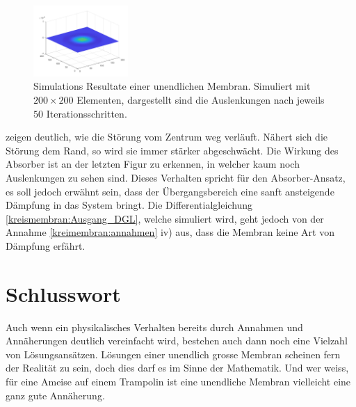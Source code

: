 \begin{figure}
\begin{center}
		\includegraphics[width=0.32\textwidth]{papers/kreismembran/images/sim_2_6.png}
		\caption{Simulations Resultate einer unendlichen Membran. Simuliert mit $ 200 \times 200 $ Elementen, dargestellt sind die Auslenkungen nach jeweils $ 50 $ Iterationsschritten.}
		\label{kreismembran:im:simres_unendlich}
		
	\end{center}	
\end{figure}
zeigen deutlich, wie die Störung vom Zentrum weg verläuft.
Nähert sich die Störung dem Rand, so wird sie immer stärker abgeschwächt.
Die Wirkung des Absorber ist an der letzten Figur zu erkennen, in welcher kaum noch Auslenkungen zu sehen sind.
Dieses Verhalten spricht für den Absorber-Ansatz, es soll jedoch erwähnt sein, dass der Übergangsbereich eine sanft ansteigende Dämpfung in das System bringt.
Die Differentialgleichung \eqref{kreismembran:Ausgang_DGL}, welche
simuliert wird, geht jedoch von der Annahme \ref{kreimembran:annahmen}
iv) aus, dass die Membran keine Art von Dämpfung erfährt.

\section{Schlusswort}
Auch wenn ein physikalisches Verhalten bereits durch Annahmen und
Annäherungen deutlich vereinfacht wird, bestehen auch dann noch
eine Vielzahl von Lösungsansätzen.
Lösungen einer unendlich grosse Membran scheinen fern der Realität
zu sein, doch dies darf es im Sinne der Mathematik.
Und wer weiss, für eine Ameise auf einem Trampolin ist eine unendliche
%
%
Membran vielleicht eine ganz gute Annäherung.






